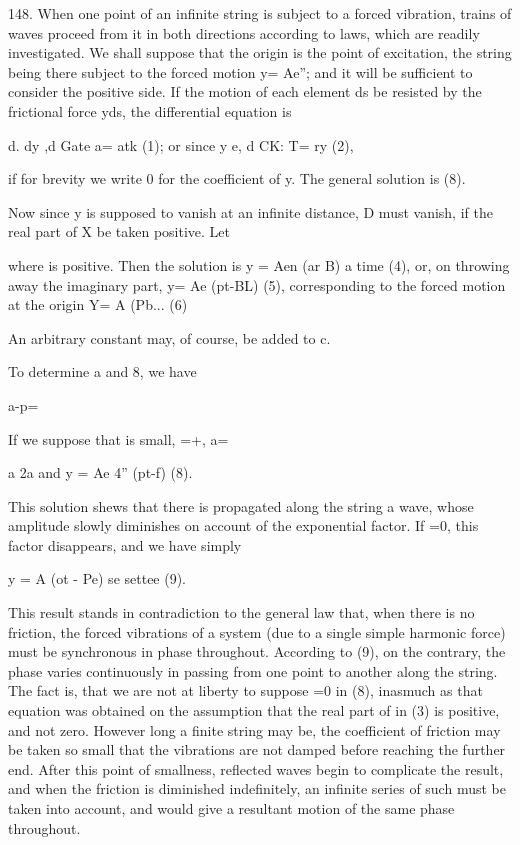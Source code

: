 148. When one point of an infinite string is subject to a forced
vibration, trains of waves proceed from it in both directions according
to laws, which are readily investigated. We shall suppose that the
origin is the point of excitation, the string being there subject to the
forced motion y= Ae''; and it will be sufficient to consider the
positive side. If the motion of each element ds be resisted by the
frictional force yds, the differential equation is

d. dy ,d Gate a= atk (1); or since y e, d CK: T= ry (2),

if for brevity we write 0 for the coefficient of y. The general solution
is (8).

Now since y is supposed to vanish at an infinite distance, D must
vanish, if the real part of X be taken positive. Let

where is positive. Then the solution is y = Aen (ar B) a time (4), or,
on throwing away the imaginary part, y= Ae (pt-BL) (5),
corresponding to the forced motion at the origin Y= A (Pb... (6)

An arbitrary constant may, of course, be added to c.

To determine a and 8, we have

a-p=


If we suppose that is small, =+, a=

a 2a and y = Ae 4'' (pt-f) (8).

This solution shews that there is propagated along the string a wave,
whose amplitude slowly diminishes on account of the exponential factor.
If =0, this factor disappears, and we have simply

y = A (ot - Pe) se settee (9).

This result stands in contradiction to the general law that, when there
is no friction, the forced vibrations of a system
(due to a single simple harmonic force) must be synchronous in phase throughout.
According to (9), on the contrary, the phase varies continuously in
passing from one point to another along the string. The fact is, that we
are not at liberty to suppose =0 in (8), inasmuch as that equation was
obtained on the assumption that the real part of in (3) is positive, and
not zero. However long a finite string may be, the coefficient of
friction may be taken so small that the vibrations are not damped before
reaching the further end. After this point of smallness, reflected waves
begin to complicate the result, and when the friction is diminished
indefinitely, an infinite series of such must be taken into account, and
would give a resultant motion of the same phase throughout.

